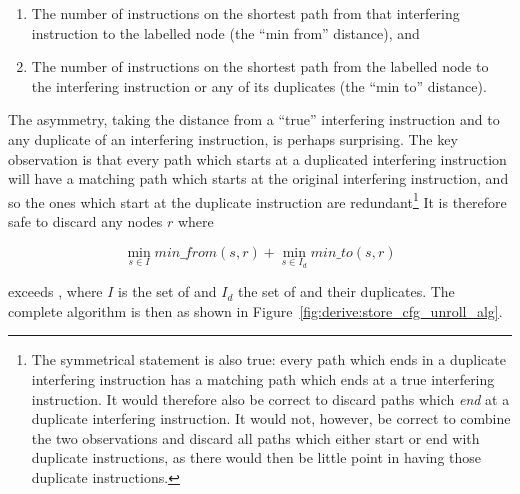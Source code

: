 \begin{enumerate}
\item
  The number of instructions on the shortest path from that
  interfering instruction to the labelled node (the ``min from''
  distance), and
\item
  The number of instructions on the shortest path from the labelled
  node to the interfering instruction or any of its duplicates (the
  ``min to'' distance).
\end{enumerate}


The asymmetry, taking the distance from a ``true'' interfering
instruction and to any duplicate of an interfering instruction, is
perhaps surprising.  The key observation is that every path which
starts at a duplicated interfering instruction will have a matching
path which starts at the original interfering instruction, and so the
ones which start at the duplicate instruction are
redundant\footnote{The symmetrical statement is also true: every path
  which ends in a duplicate interfering instruction has a matching
  path which ends at a true interfering instruction.  It would
  therefore also be correct to discard paths which \emph{end} at a
  duplicate interfering instruction.  It would not, however, be
  correct to combine the two observations and discard all paths which
  either start or end with duplicate instructions, as there would then
  be little point in having those duplicate instructions.}  It is
therefore safe to discard any nodes $r$ where

\begin{displaymath}
\min_{s \in I}\mathit{min\_from}(s, r) + \min_{s \in I_d}\mathit{min\_to}(s, r)
\end{displaymath}

exceeds \backref{$\alpha$}, where $I$ is the set of
 and $I_d$ the set of  and their duplicates.  The complete algorithm is then as
shown in Figure~\ref{fig:derive:store_cfg_unroll_alg}.

